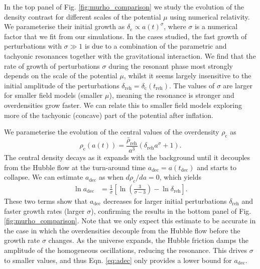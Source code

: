 \documentclass[
    reprint,
    preprintnumbers,
    superscriptaddress,
    nofootinbib,
     amsmath,amssymb,
     aps,
     prd,
    floatfix,
    ]{revtex4-2}
\newcommand{\reh}{_\mathrm{reh}}
\newcommand{\rhoc}{\rho_\mathrm{c}}
\newcommand{\adec}{a_\mathrm{dec}}
\newcommand{\deltaini}{\delta_\mathrm{reh}}
\newcommand{\deltac}{\delta_\mathrm{c}}
\begin{document}
In the top panel of Fig. \ref{fig:murho_comparison} we study the evolution of the density contrast for different scales of the potential $\mu$ using numerical relativity. We parameterise their initial growth as $\deltac\propto a(t)^\sigma$, where $\sigma$ is a numerical factor that we fit from our simulations. In the cases studied, the fast growth of perturbations with $\sigma\gg 1$ is due to a combination of the parametric and tachyonic resonances together with the gravitational interaction. We find that the rate of growth of perturbations  $\sigma$ during the resonant phase most strongly depends on the scale of the potential $\mu$, whilst it seems largely insensitive to the initial amplitude of the perturbations $\delta_\mathrm{reh}=\deltac(t\reh)$. The values of $\sigma$ are larger for smaller field models (smaller $\mu$), meaning the resonance is stronger and overdensities grow faster. We can relate this to smaller field models exploring more of the tachyonic (concave) part of the potential after inflation. 

We parameterise the evolution of the central values of the overdensity $\rhoc$ as
\begin{equation}\label{eq:rhoc}
    \rhoc\left(a(t)\right) = \frac{\bar{\rho}_\mathrm{reh}}{a^3}\left(\deltaini a^\sigma + 1\right).
\end{equation}
The central density decays as it expands with the background until it decouples from the Hubble flow at the turn-around time $\adec=a(t_\mathrm{dec})$ and starts to collapse. We can estimate $\adec$ as when  $d\rhoc/da=0$, which yields
\begin{align}\label{eq:adec}
    \ln \adec &=\frac{1}{\sigma}\left[\ln\left(\frac{3}{\sigma-3}\right) -\ln\deltaini \right].
\end{align}
These two terms show that $\adec$ decreases for larger initial perturbations $\deltaini$ and faster growth rates (larger $\sigma$), confirming the results in the bottom panel of Fig. \ref{fig:murho_comparison}. Note that we only expect this estimate to be accurate in the case in which the overdensities decouple from the Hubble flow before the growth rate $\sigma$ changes. As the universe expands, the Hubble friction damps the amplitude of the homogeneous oscillations, reducing the resonance. This drives $\sigma$ to smaller values, and thus Eqn. \eqref{eq:adec} only provides a lower bound for $\adec$. 
\end{document}
